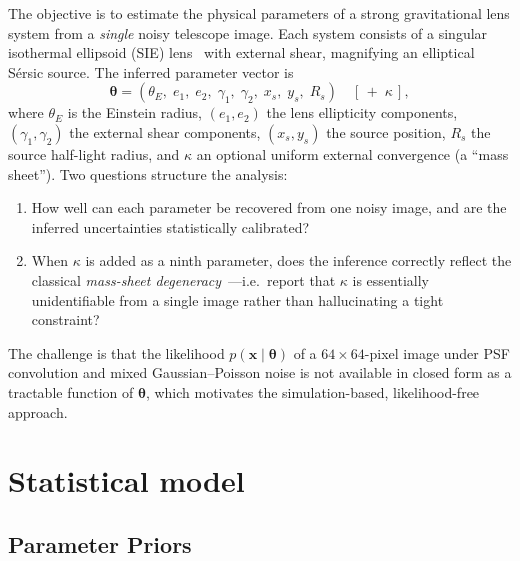 \documentclass[11pt,a4paper]{article}
\begin{document}
The objective is to estimate the physical parameters of a strong gravitational lens
system from a \emph{single} noisy telescope image. Each system consists of a singular
isothermal ellipsoid (SIE) lens~\cite{kormann1994sie} with external shear, magnifying
an elliptical S\'ersic source. The inferred parameter vector is
\begin{equation}
\boldsymbol\theta =
(\theta_E,\; e_1,\; e_2,\; \gamma_1,\; \gamma_2,\; x_s,\; y_s,\; R_s)
\quad [\,+\;\kappa\,],
\end{equation}
where $\theta_E$ is the Einstein radius, $(e_1, e_2)$ the lens ellipticity
components, $(\gamma_1, \gamma_2)$ the external shear components, $(x_s, y_s)$ the
source position, $R_s$ the source half-light radius, and $\kappa$ an optional
uniform external convergence (a ``mass sheet''). Two questions structure the
analysis:
\begin{enumerate}
    \item How well can each parameter be recovered from one noisy image, and are the
          inferred uncertainties statistically calibrated?
    \item When $\kappa$ is added as a ninth parameter, does the inference correctly
          reflect the classical \emph{mass-sheet
          degeneracy}~\cite{falco1985msd,schneider2013msd}---i.e.\ report that
          $\kappa$ is essentially unidentifiable from a single image rather than
          hallucinating a tight constraint?
\end{enumerate}
The challenge is that the likelihood $p(\mathbf{x} \mid \boldsymbol\theta)$ of a
$64\times64$-pixel image under PSF convolution and mixed Gaussian--Poisson noise is
not available in closed form as a tractable function of $\boldsymbol\theta$, which
motivates the simulation-based, likelihood-free approach.

\section{Statistical model}

\subsection{Parameter Priors}
\end{document}
